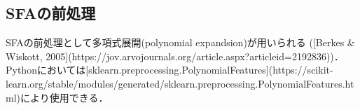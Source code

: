 \subsection{SFAの前処理}SFAの前処理として多項式展開(polynomial expandsion)が用いられる ([Berkes & Wiskott, 2005](https://jov.arvojournals.org/article.aspx?articleid=2192836))．Pythonにおいては[sklearn.preprocessing.PolynomialFeatures](https://scikit-learn.org/stable/modules/generated/sklearn.preprocessing.PolynomialFeatures.html)により使用できる．